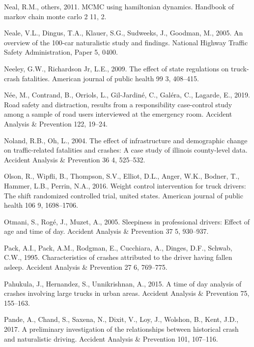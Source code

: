 \documentclass[12pt]{book}
\numberwithin{equation}{chapter}
\begin{document}
\leavevmode\hypertarget{ref-neal2011mcmc}{}%
Neal, R.M., others, 2011. MCMC using hamiltonian dynamics. Handbook of markov chain monte carlo 2 11, 2.

\leavevmode\hypertarget{ref-neale2005overview}{}%
Neale, V.L., Dingus, T.A., Klauer, S.G., Sudweeks, J., Goodman, M., 2005. An overview of the 100-car naturalistic study and findings. National Highway Traffic Safety Administration, Paper 5, 0400.

\leavevmode\hypertarget{ref-neeley2009effect}{}%
Neeley, G.W., Richardson Jr, L.E., 2009. The effect of state regulations on truck-crash fatalities. American journal of public health 99 3, 408--415.

\leavevmode\hypertarget{ref-nee2019road}{}%
Née, M., Contrand, B., Orriols, L., Gil-Jardiné, C., Galéra, C., Lagarde, E., 2019. Road safety and distraction, results from a responsibility case-control study among a sample of road users interviewed at the emergency room. Accident Analysis \& Prevention 122, 19--24.

\leavevmode\hypertarget{ref-noland2004effect}{}%
Noland, R.B., Oh, L., 2004. The effect of infrastructure and demographic change on traffic-related fatalities and crashes: A case study of illinois county-level data. Accident Analysis \& Prevention 36 4, 525--532.

\leavevmode\hypertarget{ref-olson2016weight}{}%
Olson, R., Wipfli, B., Thompson, S.V., Elliot, D.L., Anger, W.K., Bodner, T., Hammer, L.B., Perrin, N.A., 2016. Weight control intervention for truck drivers: The shift randomized controlled trial, united states. American journal of public health 106 9, 1698--1706.

\leavevmode\hypertarget{ref-otmani2005sleepiness}{}%
Otmani, S., Rogé, J., Muzet, A., 2005. Sleepiness in professional drivers: Effect of age and time of day. Accident Analysis \& Prevention 37 5, 930--937.

\leavevmode\hypertarget{ref-pack1995characteristics}{}%
Pack, A.I., Pack, A.M., Rodgman, E., Cucchiara, A., Dinges, D.F., Schwab, C.W., 1995. Characteristics of crashes attributed to the driver having fallen asleep. Accident Analysis \& Prevention 27 6, 769--775.

\leavevmode\hypertarget{ref-pahukula2015time}{}%
Pahukula, J., Hernandez, S., Unnikrishnan, A., 2015. A time of day analysis of crashes involving large trucks in urban areas. Accident Analysis \& Prevention 75, 155--163.

\leavevmode\hypertarget{ref-pande2017preliminary}{}%
Pande, A., Chand, S., Saxena, N., Dixit, V., Loy, J., Wolshon, B., Kent, J.D., 2017. A preliminary investigation of the relationships between historical crash and naturalistic driving. Accident Analysis \& Prevention 101, 107--116.
\end{document}
